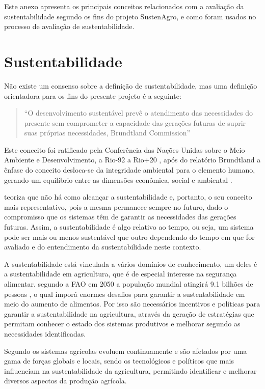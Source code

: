 Este anexo apresenta os principais conceitos relacionados com a avaliação
da sustentabilidade segundo os fins do projeto SustenAgro, e como
foram usados no processo de avaliação de sustentabilidade.

\section{Sustentabilidade}

Não existe um consenso sobre a definição de sustentabilidade, mas
uma definição orientadora para os fins do presente projeto é a seguinte:
\begin{quotation}
``O desenvolvimento sustentável prevê o atendimento das necessidades
do presente sem comprometer a capacidade das gerações futuras de suprir
suas próprias necessidades, \foreignlanguage{english}{Brundtland Commission}''
\citep{Burton:1987,brundtland1987our}
\end{quotation}
Este conceito foi ratificado pela Conferência das Nações Unidas sobre
o Meio Ambiente e Desenvolvimento, a Rio-92 \citep{ehlers1996agricultura}
a Rio+20 \citep{ONU2012}, após do relatório \foreignlanguage{english}{Brundtland}
a ênfase do conceito desloca-se da integridade ambiental para o elemento
humano, gerando um equilíbrio entre as dimensões econômica, social
e ambiental \citep{van2005indicadores}.

\citet{gliessman2001agroecologia} teoriza que não há como alcançar
a sustentabilidade e, portanto, o seu conceito mais representativo,
pois a mesma permanece sempre no futuro, dado o compromisso que os
sistemas têm de garantir as necessidades das gerações futuras. Assim,
a sustentabilidade é algo relativo ao tempo, ou seja, um sistema pode
ser mais ou menos sustentável que outro dependendo do tempo em que
for avaliado e do entendimento da sustentabilidade neste contexto.

A sustentabilidade está vinculada a vários domínios de conhecimento,
um deles é a sustentabilidade em agricultura, que é de especial interesse
na segurança alimentar. segundo a FAO em 2050 a população mundial
atingirá 9.1 bilhões de pessoas \citep{fischer2009can}, o qual imporá
enormes desafios para garantir a sustentabilidade em meio do aumento
de alimentos. Por isso são necessários incentivos e políticas para
garantir a sustentabilidade na agricultura, através da geração de
estratégias que permitam conhecer o estado dos sistemas produtivos
e melhorar segundo as necessidades identificadas.

Segundo \citet{van2008integrated} os sistemas agrícolas evoluem continuamente
e são afetados por uma gama de forças globais e locais, sendo os tecnológicos
e políticos que mais influenciam na sustentabilidade da agricultura,
permitindo identificar e melhorar diversos aspectos da produção agrícola. 

